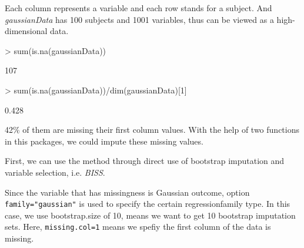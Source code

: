 \documentclass[a4paper]{article}
\begin{document}
Each column represents a variable and each row stands for a subject. And \emph{gaussianData} has 100 subjects and 1001 variables, thus can be viewed as a high-dimensional data.
\begin{Schunk}
\begin{Sinput}
> sum(is.na(gaussianData))
\end{Sinput}
\begin{Soutput}
[1] 107
\end{Soutput}
\begin{Sinput}
> sum(is.na(gaussianData))/dim(gaussianData)[1]
\end{Sinput}
\begin{Soutput}
[1] 0.428
\end{Soutput}
\end{Schunk}
42\% of them are missing their first column values. With the help of two functions in this packages, we could impute these missing values.

First, we can use the method through direct use of bootstrap imputation and variable selection, i.e. \emph{BISS}.

Since the variable that has missingness is Gaussian outcome, option {\tt family="gaussian"} is used to specify the certain regressionfamily type. In this case, we use bootstrap.size of 10, means we want to get 10 bootstrap imputation sets.  Here, {\tt missing.col=1} means we spefiy the first column of the data is missing.
\end{document}

